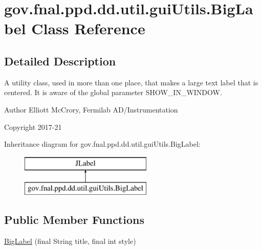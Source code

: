 \hypertarget{classgov_1_1fnal_1_1ppd_1_1dd_1_1util_1_1guiUtils_1_1BigLabel}{\section{gov.\-fnal.\-ppd.\-dd.\-util.\-gui\-Utils.\-Big\-Label Class Reference}
\label{classgov_1_1fnal_1_1ppd_1_1dd_1_1util_1_1guiUtils_1_1BigLabel}
}


\subsection{Detailed Description}
A utility class, used in more than one place, that makes a large text label that is centered. It is aware of the global parameter S\-H\-O\-W\-\_\-\-I\-N\-\_\-\-W\-I\-N\-D\-O\-W.

\begin{DoxyAuthor}{Author}
Elliott Mc\-Crory, Fermilab A\-D/\-Instrumentation 
\end{DoxyAuthor}
\begin{DoxyCopyright}{Copyright}
2017-\/21 
\end{DoxyCopyright}
Inheritance diagram for gov.\-fnal.\-ppd.\-dd.\-util.\-gui\-Utils.\-Big\-Label\-:\begin{figure}[H]
\begin{center}
\leavevmode
\includegraphics[height=2.000000cm]{classgov_1_1fnal_1_1ppd_1_1dd_1_1util_1_1guiUtils_1_1BigLabel}
\end{center}
\end{figure}
\subsection*{Public Member Functions}
\begin{DoxyCompactItemize}
\item 
\hyperlink{classgov_1_1fnal_1_1ppd_1_1dd_1_1util_1_1guiUtils_1_1BigLabel_a893a2b6ab9309341513be1ae20841a01}{Big\-Label} (final String title, final int style)
\end{DoxyCompactItemize}


